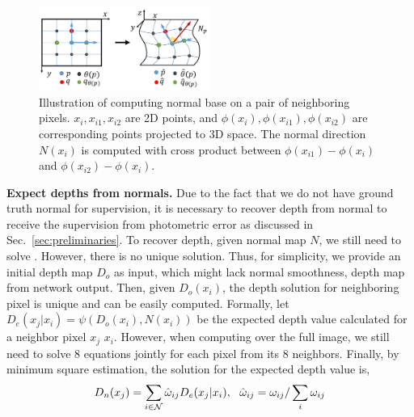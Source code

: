 \begin{figure}
\centering
\includegraphics[width=0.5\textwidth]{figures/d2n.pdf}
\caption{Illustration of computing normal base on a pair of neighboring pixels. $x_i, x_{i1}, x_{i2}$ are 2D points, and 
$\phi(x_i), \phi(x_{i1}), \phi(x_{i2})$ are corresponding points projected to 3D space. 
The normal direction $N(x_i)$ is computed with cross product between $\phi(x_{i1}) - \phi(x_i)$ and $\phi(x_{i2}) - \phi(x_i)$.}
\vspace{-0.7\baselineskip}
\label{fig:d2n}
\end{figure}

\textbf{Expect depths from normals.} 
Due to the fact that we do not have ground truth normal for supervision, it is necessary to recover depth from normal to receive the supervision from photometric error as discussed in Sec.~\ref{sec:preliminaries}.
To recover depth, given normal map $N$, we still need to solve . However, there is no unique solution. Thus, for simplicity, we provide an initial depth map $D_o$ as input, which might lack normal smoothness, \eg depth map from network output. Then, given $D_o(x_i)$, the depth solution for neighboring pixel is unique and can be easily computed. Formally, let $D_e(x_j | x_i) = \psi(D_o(x_i), N(x_i))$ be the expected depth value calculated for a neighbor pixel $x_j$ \wrt $x_i$. 
However, when computing over the full image, we still need to solve 8 equations jointly for each pixel from its 8 neighbors. Finally, by minimum square estimation, the solution for the expected depth value is,
\begin{align}
\label{eq:depth}
D_n(x_j) = \sum_{i\in{\mathcal N}}\hat{\omega}_{ij}D_e(x_j | x_i), \text{~~}
\hat{\omega}_{ij} = \omega_{ij} / \sum_i{\omega_{ij}}
\end{align}


